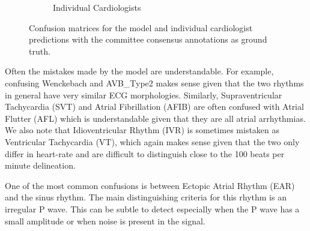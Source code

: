 \begin{figure}
\begin{subfigure}{.5\textwidth}
  \caption{Individual Cardiologists}
  \label{fig:arrhythmias:human_confusion}
\end{subfigure}
\caption{Confusion matrices for the model and individual cardiologist
         predictions with the committee consensus annotations as ground
         truth.}
\end{figure}

Often the mistakes made by the model are understandable. For example, confusing
Wenckebach and AVB\_Type2 makes sense given that the two rhythms in general
have very similar ECG morphologies. Similarly, Supraventricular Tachycardia
(SVT) and Atrial Fibrillation (AFIB) are often confused with Atrial Flutter
(AFL) which is understandable given that they are all atrial arrhythmias. We
also note that Idioventricular Rhythm (IVR) is sometimes mistaken as
Ventricular Tachycardia (VT), which again makes sense given that the two only
differ in heart-rate and are difficult to distinguish close to the 100 beats
per minute delineation.

One of the most common confusions is between Ectopic Atrial Rhythm (EAR) and
the sinus rhythm. The main distinguishing criteria for this rhythm is an
irregular P wave. This can be subtle to detect especially when the P wave has a
small amplitude or when noise is present in the signal.
